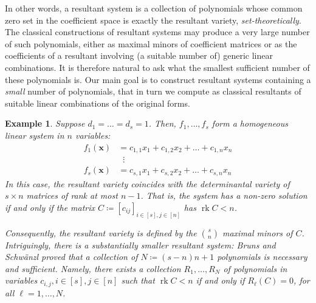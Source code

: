 \documentclass[11pt,a4paper]{article}
\newtheorem{example}[theorem]{Example}\AddToHook{env/example/begin}{\crefalias{theorem}{example}}
\numberwithin{equation}{section}
\newcommand{\xx}{\ensuremath{\boldsymbol{x}}}
\DeclareMathOperator{\rk}{rk}
\begin{document}
In other words, a resultant system is a 
collection of polynomials whose common zero set 
in the coefficient space is exactly the resultant variety, \emph{set-theoretically}. 
The classical constructions of resultant systems 
may produce a very large number of such polynomials, 
either as maximal minors of coefficient matrices or 
as the coefficients of a resultant involving (a suitable number of) 
generic linear combinations.
It is therefore natural to ask what the
smallest sufficient number of these polynomials is.
Our main goal is to construct resultant systems 
containing a \emph{small} number of polynomials,
that in turn we compute as classical resultants of suitable linear combinations of the original forms.


\begin{example}
\label{ex:maximal-minors}
    Suppose $d_1 = \dots = d_s = 1$. Then, $f_1,\dots,f_s$ form a homogeneous linear system in $n$ variables:\[
    \begin{split}
    f_1(\xx) &= c_{1,1} x_1 + c_{1,2} x_2 + \dots + c_{1,n} x_n\\
    &\;\;\vdots\\
    f_s(\xx) &= c_{s,1} x_1 + c_{s,2} x_2 + \dots + c_{s,n} x_n
    \end{split}
    \]
    In this case, the resultant variety coincides with the determinantal variety of $s\times n$ matrices of rank at most $n-1$.
    That is, the system has a non-zero solution if and only if the matrix $C\coloneqq [c_{ij}]_{i\in [s], j \in [n]}$ has $\rk C<n$.
    
    Consequently, the resultant variety is defined by the $\binom{s}{n}$ maximal minors of $C$. 
    Intriguingly, there is a substantially smaller resultant system:
    Bruns and Schw\"{a}nzl \cite{Bruns-89,Bruns-Schwanzl-90} proved that a collection of $N\coloneqq (s-n)n+1$ polynomials is necessary and sufficient.
    Namely, there exists a collection $R_1,\dots,R_{N}$ of polynomials in variables $c_{i,j}, i\in [s], j\in [n]$ such that $\rk C<n$ if and only if $R_\ell(C)=0$,
    for all $\ell=1,\dots,N$.
\end{example}
\end{document}
